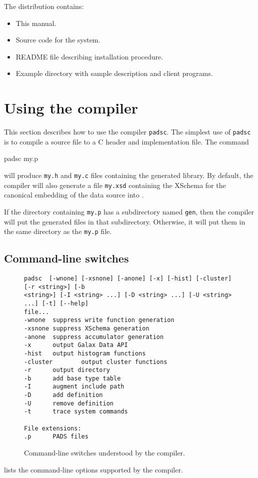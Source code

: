 \begin{center}
\end{center}

\noindent
The \PADS{} distribution contains:
\begin{itemize}
\item This manual.
\item Source code for the \pads{} system.
\item README file describing installation procedure.
\item Example directory with sample \PADS{} description and client programs.
\end{itemize}

\section{Using the \PADS{} compiler}
This section describes how to use the \PADS{} compiler \texttt{padsc}.
The simplest use of \texttt{padsc} is to compile a \PADSL{} source file
to a C header and implementation file.  The command
\begin{centercode}
padsc my.p
\end{centercode} %
will produce \texttt{my.h} and \texttt{my.c} files containing the
generated library.  By default, the compiler will also generate a file
\texttt{my.xsd} containing the XSchema for the \PADS{} canonical
embedding of the data source into \xml{}.

If the directory containing \texttt{my.p} has a subdirectory named
\texttt{gen}, then the compiler will put the generated files in that
subdirectory.  Otherwise, it will put them in the same directory as
the \texttt{my.p} file.

\subsection{Command-line switches}
\begin{figure}
\begin{verbatim}
padsc  [-wnone] [-xsnone] [-anone] [-x] [-hist] [-cluster] [-r <string>] [-b
<string>] [-I <string> ...] [-D <string> ...] [-U <string> ...] [-t] [--help]
file...
-wnone  suppress write function generation
-xsnone suppress XSchema generation
-anone  suppress accumulator generation
-x      output Galax Data API
-hist   output histogram functions
-cluster        output cluster functions
-r      output directory
-b      add base type table
-I      augment include path
-D      add definition
-U      remove definition
-t      trace system commands

File extensions:
.p      PADS files
\end{verbatim}
\caption{Command-line switches understood by the \pads{} compiler.}
\label{figure:intro-switches}
\end{figure}
 lists the command-line options
supported by the \pads{} compiler.



